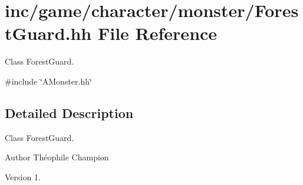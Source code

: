 \hypertarget{ForestGuard_8hh}{}\section{inc/game/character/monster/\+Forest\+Guard.hh File Reference}
\label{ForestGuard_8hh}


Class Forest\+Guard.  


{\ttfamily \#include \char`\"{}A\+Monster.\+hh\char`\"{}}\newline


\subsection{Detailed Description}
Class Forest\+Guard. 

\begin{DoxyAuthor}{Author}
Théophile Champion 
\end{DoxyAuthor}
\begin{DoxyVersion}{Version}
1. 
\end{DoxyVersion}
